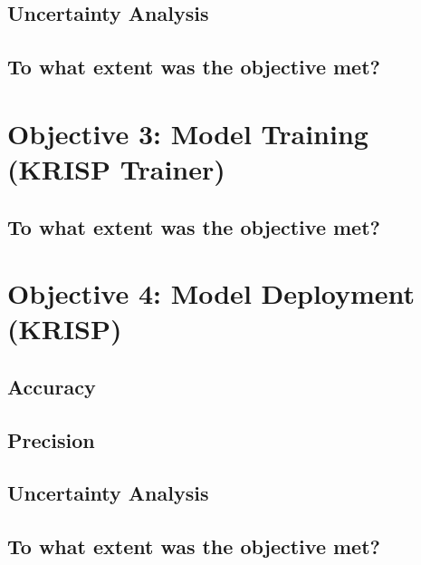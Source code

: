 \subsection{Uncertainty Analysis}

\subsection{To what extent was the objective met?}


\section{Objective 3: Model Training (KRISP Trainer)}
\subsection{}
\subsection{To what extent was the objective met?}

\section{Objective 4: Model Deployment (KRISP)}
\subsection{Accuracy}

\subsection{Precision}

\subsection{Uncertainty Analysis}

\subsection{To what extent was the objective met?}

